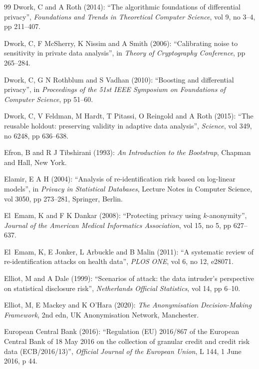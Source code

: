 \documentclass[11pt,a4paper]{article}
\theoremstyle{plain}
\theoremstyle{definition}
\theoremstyle{definition}
\theoremstyle{plain}
\begin{document}
\begin{thebibliography}{99}
Dwork, C and A Roth (2014): ``The algorithmic foundations of differential privacy'', \emph{Foundations and Trends in Theoretical Computer Science}, vol 9, no 3--4, pp 211--407.

Dwork, C, F McSherry, K Nissim and A Smith (2006): ``Calibrating noise to sensitivity in private data analysis'', in \emph{Theory of Cryptography Conference}, pp 265--284.

Dwork, C, G N Rothblum and S Vadhan (2010): ``Boosting and differential privacy'', in \emph{Proceedings of the 51st IEEE Symposium on Foundations of Computer Science}, pp 51--60.

Dwork, C, V Feldman, M Hardt, T Pitassi, O Reingold and A Roth (2015): ``The reusable holdout: preserving validity in adaptive data analysis'', \emph{Science}, vol 349, no 6248, pp 636--638.

Efron, B and R J Tibshirani (1993): \emph{An Introduction to the Bootstrap}, Chapman and Hall, New York.

Elamir, E A H (2004): ``Analysis of re-identification risk based on log-linear models'', in \emph{Privacy in Statistical Databases}, Lecture Notes in Computer Science, vol 3050, pp 273--281, Springer, Berlin.

El~Emam, K and F K Dankar (2008): ``Protecting privacy using $k$-anonymity'', \emph{Journal of the American Medical Informatics Association}, vol 15, no 5, pp 627--637.

El~Emam, K, E Jonker, L Arbuckle and B Malin (2011): ``A systematic review of re-identification attacks on health data'', \emph{PLOS ONE}, vol 6, no 12, e28071.

Elliot, M and A Dale (1999): ``Scenarios of attack: the data intruder's perspective on statistical disclosure risk'', \emph{Netherlands Official Statistics}, vol 14, pp 6--10.

Elliot, M, E Mackey and K O'Hara (2020): \emph{The Anonymisation Decision-Making Framework}, 2nd edn, UK Anonymisation Network, Manchester.

European Central Bank (2016): ``Regulation (EU) 2016/867 of the European Central Bank of 18 May 2016 on the collection of granular credit and credit risk data (ECB/2016/13)'', \emph{Official Journal of the European Union}, L 144, 1 June 2016, p 44.


\end{thebibliography}
\end{document}
